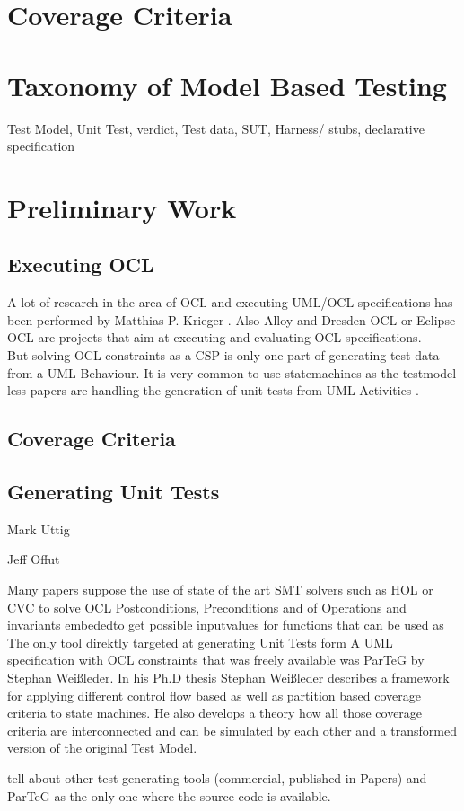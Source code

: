 \section{Coverage Criteria}
\section{Taxonomy of Model Based Testing}
Test Model,
Unit Test,
verdict,
Test data,
SUT,
Harness/ stubs,
declarative specification

\section{Preliminary Work}
\label{sec:RelatedWork}
\subsection{Executing OCL}
A lot of research in the area of OCL and executing UML/OCL specifications has been performed by Matthias P. Krieger \cite{krieger2008executingUnderspecifiedOCL}. Also Alloy and Dresden OCL or Eclipse OCL are projects that aim at executing and evaluating OCL specifications. 
\\
But solving OCL constraints as a CSP is only one part of generating test data from a UML Behaviour.
It is very common to use statemachines as the testmodel less papers are handling the generation of unit tests from UML Activities\cite{Linzhang04GeneratingTestCasefromActivityGrayBoxMethod}
\cite{Patel12TestCaseFormationUsigUMLActivityDiagram}
\cite{Pechtanun12GeneratingTestCaseFromUMLActivityDiagramBasedOnACGrammar}
\cite{Xu09ModelCheckingUMLActivities}\cite{Xu09ModelCheckingUMLActivityDiagramsFDR}. 


\subsection{Coverage Criteria}



\subsection{Generating Unit Tests}
Mark Uttig

Jeff Offut

Many papers suppose the use of state of the art SMT solvers such as HOL or CVC to solve OCL Postconditions, Preconditions and  of Operations and invariants embededto get possible inputvalues for functions that can be used as 
The only tool direktly targeted at generating Unit Tests form A UML specification with OCL constraints that was freely available was ParTeG by Stephan Weißleder. In his Ph.D thesis Stephan Weißleder describes a framework for applying different control flow based as well as partition based coverage criteria to state machines. He also develops a theory how all those coverage criteria are interconnected and can be simulated by each other and a transformed version of the original Test Model\cite{ParTeG}.


tell about other test generating tools (commercial, published in Papers) and ParTeG as the only one where the source code is available.\cite{ParTeG}

